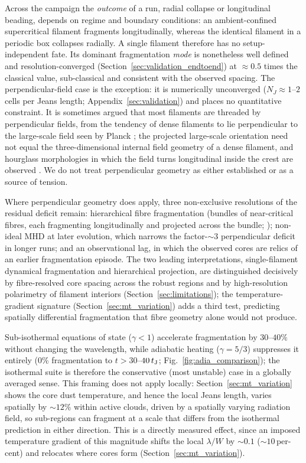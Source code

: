 \documentclass[usenatbib,twoside,twocolumn]{mnras}
\begin{document}
Across the campaign the \emph{outcome} of a run, radial collapse or longitudinal beading, depends on regime and boundary conditions: an ambient-confined supercritical filament fragments longitudinally, whereas the identical filament in a periodic box collapses radially. A single filament therefore has no setup-independent fate. Its dominant fragmentation \emph{mode} is nonetheless well defined and resolution-converged (Section~\ref{sec:validation_endtoend}) at $\approx0.5$ times the classical value, sub-classical and consistent with the observed spacing. The perpendicular-field case is the exception: it is numerically unconverged ($N_J\approx1$--$2$ cells per Jeans length; Appendix~\ref{sec:validation}) and places no quantitative constraint. It is sometimes argued that most filaments are threaded by perpendicular fields, from the tendency of dense filaments to lie perpendicular to the large-scale field seen by Planck \citep{Planck2016}; the projected large-scale orientation need not equal the three-dimensional internal field geometry of a dense filament, and hourglass morphologies in which the field turns longitudinal inside the crest are observed \citep{Jadhav2026}. We do not treat perpendicular geometry as either established or as a source of tension.

Where perpendicular geometry does apply, three non-exclusive resolutions of the residual deficit remain: hierarchical fibre fragmentation (bundles of near-critical fibres, each fragmenting longitudinally and projected across the bundle; \citealt{Hacar2013,Hacar2018,Yang2024}); non-ideal MHD at later evolution, which narrows the factor-$\sim3$ perpendicular deficit in longer runs; and an observational lag, in which the observed cores are relics of an earlier fragmentation episode. The two leading interpretations, single-filament dynamical fragmentation and hierarchical projection, are distinguished decisively by fibre-resolved core spacing across the robust regions and by high-resolution polarimetry of filament interiors (Section~\ref{sec:limitations}); the temperature-gradient signature (Section~\ref{sec:mt_variation}) adds a third test, predicting spatially differential fragmentation that fibre geometry alone would not produce.

Sub-isothermal equations of state ($\gamma<1$) accelerate fragmentation by $30$--$40\%$ without changing the wavelength, while adiabatic heating ($\gamma=5/3$) suppresses it entirely (0\% fragmentation to $t>30$--$40\,t_{\rm J}$; Fig.~\ref{fig:adia_comparison}); the isothermal suite is therefore the conservative (most unstable) case in a globally averaged sense. This framing does not apply locally: Section~\ref{sec:mt_variation} shows the core dust temperature, and hence the local Jeans length, varies spatially by $\sim12\%$ within active clouds, driven by a spatially varying radiation field, so sub-regions can fragment at a scale that differs from the isothermal prediction in either direction. This is a directly measured effect, since an imposed temperature gradient of this magnitude shifts the local $\lambda/W$ by $\sim0.1$ ($\sim10$\,per-cent) and relocates where cores form (Section~\ref{sec:mt_variation}).
\end{document}
